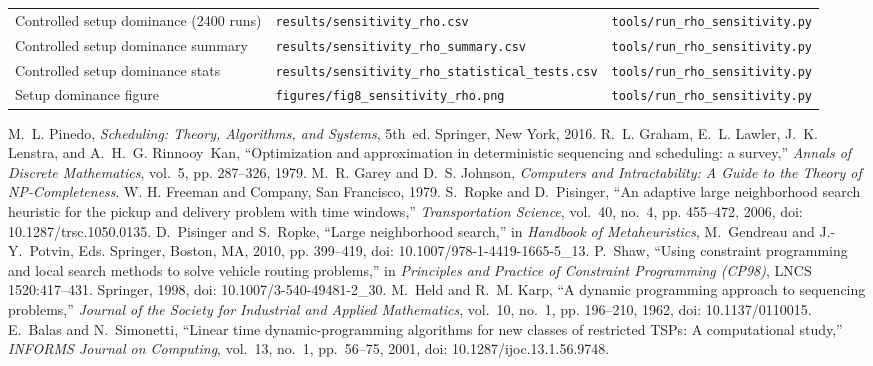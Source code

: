 \documentclass[journal]{IEEEtran}
\begin{document}
\begin{table}[htbp]
\begin{tabularx}{\textwidth}{p{5.5cm}p{6.0cm}p{4.5cm}}
Controlled setup dominance (2400 runs) & \texttt{results/sensitivity\_rho.csv} & \texttt{tools/run\_rho\_sensitivity.py} \\
Controlled setup dominance summary & \texttt{results/sensitivity\_rho\_summary.csv} & \texttt{tools/run\_rho\_sensitivity.py} \\
Controlled setup dominance stats & \texttt{results/sensitivity\_rho\_statistical\_tests.csv} & \texttt{tools/run\_rho\_sensitivity.py} \\
Setup dominance figure & \texttt{figures/fig8\_sensitivity\_rho.png} & \texttt{tools/run\_rho\_sensitivity.py} \\
\bottomrule
\end{tabularx}
\end{table}

\begin{thebibliography}{99}
 M.~L. Pinedo, \emph{Scheduling: Theory, Algorithms, and Systems}, 5th~ed. Springer, New York, 2016.
 R.~L. Graham, E.~L. Lawler, J.~K. Lenstra, and A.~H.~G. Rinnooy~Kan, ``Optimization and approximation in deterministic sequencing and scheduling: a survey,'' \emph{Annals of Discrete Mathematics}, vol.~5, pp. 287--326, 1979.
 M.~R. Garey and D.~S. Johnson, \emph{Computers and Intractability: A Guide to the Theory of NP-Completeness}. W. H. Freeman and Company, San Francisco, 1979.
 S.~Ropke and D.~Pisinger, ``An adaptive large neighborhood search heuristic for the pickup and delivery problem with time windows,'' \emph{Transportation Science}, vol.~40, no.~4, pp. 455--472, 2006, doi: 10.1287/trsc.1050.0135.
 D.~Pisinger and S.~Ropke, ``Large neighborhood search,'' in \emph{Handbook of Metaheuristics}, M.~Gendreau and J.-Y.~Potvin, Eds. Springer, Boston, MA, 2010, pp. 399--419, doi: 10.1007/978-1-4419-1665-5\_13.
 P.~Shaw, ``Using constraint programming and local search methods to solve vehicle routing problems,'' in \emph{Principles and Practice of Constraint Programming (CP98)}, LNCS 1520:417--431. Springer, 1998, doi: 10.1007/3-540-49481-2\_30.
 M.~Held and R.~M. Karp, ``A dynamic programming approach to sequencing problems,'' \emph{Journal of the Society for Industrial and Applied Mathematics}, vol.~10, no.~1, pp. 196--210, 1962, doi: 10.1137/0110015.
 E.~Balas and N.~Simonetti, ``Linear time dynamic-programming algorithms for new classes of restricted TSPs: A computational study,'' \emph{INFORMS Journal on Computing}, vol.~13, no.~1, pp.~56--75, 2001, doi: 10.1287/ijoc.13.1.56.9748.

\end{thebibliography}
\end{document}
